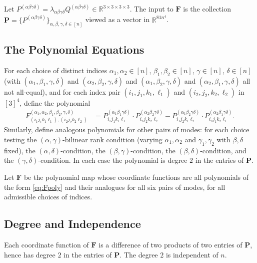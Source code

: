 \documentclass[12pt]{article}
\theoremstyle{definition}
\newcommand{\R}{\mathbb{R}}
\begin{document}
Let $P^{(\alpha\beta\gamma\delta)} = \lambda_{\alpha\beta\gamma\delta}Q^{(\alpha\beta\gamma\delta)} \in \R^{3\times 3\times 3\times 3}$. The input to $\mathbf{F}$ is the collection $\mathbf{P} = \{P^{(\alpha\beta\gamma\delta)}\}_{\alpha,\beta,\gamma,\delta \in [n]}$ viewed as a vector in $\R^{81n^4}$.

\subsection{The Polynomial Equations}

For each choice of distinct indices $\alpha_1, \alpha_2 \in [n]$, $\beta_1, \beta_2 \in [n]$, $\gamma \in [n]$, $\delta \in [n]$ (with $(\alpha_1,\beta_1,\gamma,\delta)$ and $(\alpha_2,\beta_2,\gamma,\delta)$ and $(\alpha_1,\beta_2,\gamma,\delta)$ and $(\alpha_2,\beta_1,\gamma,\delta)$ all not all-equal), and for each index pair $(i_1,j_1,k_1,\ell_1)$ and $(i_2,j_2,k_2,\ell_2)$ in $[3]^4$, define the polynomial
\begin{align}\label{eq:Fpoly}
F^{(\alpha_1,\alpha_2,\beta_1,\beta_2,\gamma,\delta)}_{(i_1 j_1 k_1 \ell_1),(i_2 j_2 k_2 \ell_2)} &=
P^{(\alpha_1\beta_1\gamma\delta)}_{i_1 j_1 k_1 \ell_1} \cdot P^{(\alpha_2\beta_2\gamma\delta)}_{i_2 j_2 k_2 \ell_2}
- P^{(\alpha_1\beta_2\gamma\delta)}_{i_1 j_2 k_1 \ell_2} \cdot P^{(\alpha_2\beta_1\gamma\delta)}_{i_2 j_1 k_2 \ell_1}.
\end{align}
Similarly, define analogous polynomials for other pairs of modes: for each choice testing the $(\alpha,\gamma)$-bilinear rank condition (varying $\alpha_1,\alpha_2$ and $\gamma_1,\gamma_2$ with $\beta,\delta$ fixed), the $(\alpha,\delta)$-condition, the $(\beta,\gamma)$-condition, the $(\beta,\delta)$-condition, and the $(\gamma,\delta)$-condition. In each case the polynomial is degree $2$ in the entries of $\mathbf{P}$.

Let $\mathbf{F}$ be the polynomial map whose coordinate functions are all polynomials of the form \eqref{eq:Fpoly} and their analogues for all six pairs of modes, for all admissible choices of indices.

\subsection{Degree and Independence}

Each coordinate function of $\mathbf{F}$ is a difference of two products of two entries of $\mathbf{P}$, hence has degree $2$ in the entries of $\mathbf{P}$. The degree $2$ is independent of $n$.
\end{document}
